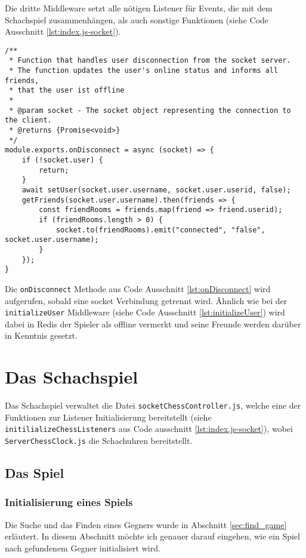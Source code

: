 Die dritte Middleware setzt alle nötigen Listener für Events, die mit dem Schachspiel zusammenhängen, als auch sonstige Funktionen (siehe Code Ausschnitt \ref{lst:index.js-socket}).

\begin{lstlisting}[style=codeStyle, caption={Die onDisconnect Methode für Sockets}, label={lst:onDisconnect}]
/**
 * Function that handles user disconnection from the socket server.
 * The function updates the user's online status and informs all friends,
 * that the user ist offline
 *
 * @param socket - The socket object representing the connection to the client.
 * @returns {Promise<void>}
 */
module.exports.onDisconnect = async (socket) => {
    if (!socket.user) {
        return;
    }
    await setUser(socket.user.username, socket.user.userid, false);
    getFriends(socket.user.username).then(friends => {
        const friendRooms = friends.map(friend => friend.userid);
        if (friendRooms.length > 0) {
            socket.to(friendRooms).emit("connected", "false", socket.user.username);
        }
    });
}
\end{lstlisting}

Die \verb|onDisconnect| Methode aus Code Ausschnitt \ref{lst:onDisconnect} wird aufgerufen, sobald eine socket Verbindung getrennt wird. Ähnlich wie bei der \verb|initializeUser| Middleware (siehe Code Ausschnitt \ref{lst:initializeUser}) wird dabei in Redis der Spieler als offline vermerkt und seine Freunde werden darüber in Kenntnis gesetzt.


\section{Das Schachspiel}
Das Schachspiel verwaltet die Datei \verb|socketChessController.js|, welche eine der Funktionen zur Listener Initialisierung bereitstellt (siehe \verb|initilializeChessListeners| aus Code ausschnitt \ref{lst:index.js-socket}), wobei \verb|ServerChessClock.js| die Schachuhren bereitstellt.

\subsection{Das Spiel}
\subsubsection{Initialisierung eines Spiels}
Die Suche und das Finden eines Gegners wurde in Abschnitt \ref{sec:find_game} erläutert. In diesem Abschnitt möchte ich genauer darauf eingehen, wie ein Spiel nach gefundenem Gegner initialisiert wird.

